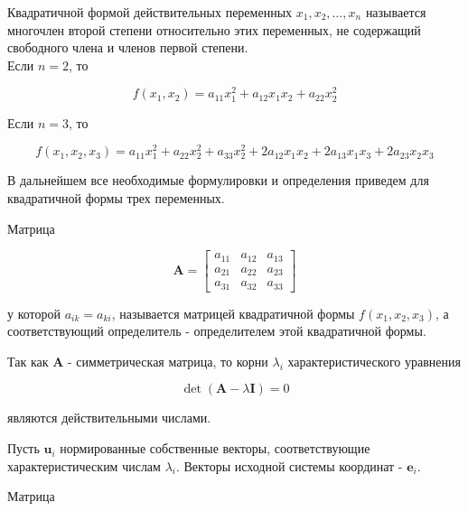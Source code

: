     	Квадратичной формой действительных переменных $x_{1}, x_{2}, \ldots, x_{n}$ называется многочлен второй степени относительно этих переменных, не содержащий свободного члена и членов первой степени. \\

    	Если $n = 2$, то 

    	\begin{equation}
    		f \left( x_{1}, x_{2} \right) = a_{11} x^{2}_{1} + a_{12} x_{1} x_{2} + a_{22} x^{2}_{2}
    	\end{equation}

    	Если $n = 3$, то 

    	\begin{equation}
    		f \left( x_{1}, x_{2}, x_{3} \right) = a_{11} x^{2}_{1} + a_{22} x^{2}_{2} + a_{33} x^{2}_{2} + 2 a_{12} x_{1} x_{2} + 2 a_{13} x_{1} x_{3} + 2 a_{23} x_{2} x_{3}
    	\end{equation}

    	В дальнейшем все необходимые формулировки и определения приведем для квадратичной формы трех переменных.

    	Матрица

    	\begin{equation}
    		\mathbf{A} =
    		\begin{bmatrix}
    			a_{11} & a_{12} & a_{13} \\
    			a_{21} & a_{22} & a_{23} \\
    			a_{31} & a_{32} & a_{33}
    		\end{bmatrix}
    	\end{equation}

    	у которой $a_{ik} = a_{ki}$, называется матрицей квадратичной формы $f \left( x_{1}, x_{2}, x_{3} \right)$, а соответствующий определитель - определителем этой квадратичной формы.

    	Так как $\mathbf{A}$ - симметрическая матрица, то корни $\lambda_{i}$ характеристического уравнения

    	\begin{equation}
    		\det \left( \mathbf{A} - \lambda \mathbf{I} \right) = 0
    	\end{equation}

    	являются действительными числами.

    	Пусть $\mathbf{u}_{i}$ нормированные собственные векторы, соответствующие характеристическим числам $\lambda_{i}$. Векторы исходной системы координат - $\mathbf{e}_{i}$.

    	Матрица

